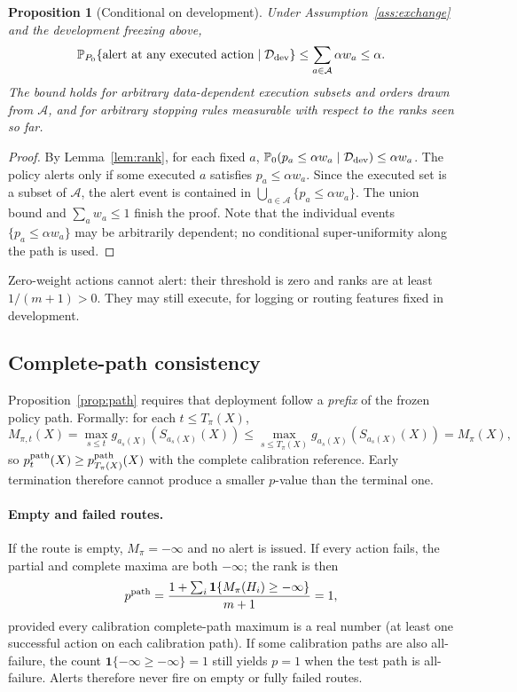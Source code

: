 \documentclass[pdflatex,sn-mathphys-num]{sn-jnl}
\newtheorem{proposition}{Proposition}
\newcommand{\Prob}{\mathbb{P}}
\newcommand{\ind}{\mathbf{1}}
\newcommand{\calD}{\mathcal{D}}
\newcommand{\calA}{\mathcal{A}}
\begin{document}
\begin{appendices}
\begin{proposition}[Conditional on development]\label{prop:spending-full}
Under Assumption~\ref{ass:exchange} and the development freezing above,
\[
 \Prob_{P_0}\{\text{alert at any executed action}\mid \calD_{\rm dev}\}
 \leq \sum_{a\in\calA}\alpha w_a \leq \alpha.
\]
The bound holds for arbitrary data-dependent execution subsets and orders drawn from \(\calA\), and for arbitrary stopping rules measurable with respect to the ranks seen so far.
\end{proposition}
\begin{proof}
By Lemma~\ref{lem:rank}, for each fixed \(a\), \(\Prob_0(p_a\leq\alpha w_a\mid\calD_{\rm dev})\leq\alpha w_a\). The policy alerts only if some executed \(a\) satisfies \(p_a\leq\alpha w_a\). Since the executed set is a subset of \(\calA\), the alert event is contained in \(\bigcup_{a\in\calA}\{p_a\leq\alpha w_a\}\). The union bound and \(\sum_a w_a\leq1\) finish the proof. Note that the individual events \(\{p_a\leq\alpha w_a\}\) may be arbitrarily dependent; no conditional super-uniformity along the path is used.
\end{proof}

Zero-weight actions cannot alert: their threshold is zero and ranks are at least \(1/(m+1)>0\). They may still execute, for logging or routing features fixed in development.

\subsection{Complete-path consistency}\label{app:complete-path}

Proposition~\ref{prop:path} requires that deployment follow a \emph{prefix} of the frozen policy path. Formally: for each \(t\leq T_\pi(X)\),
\[
 M_{\pi,t}(X)=\max_{s\leq t} g_{a_s(X)}(S_{a_s(X)}(X))
 \leq \max_{s\leq T_\pi(X)} g_{a_s(X)}(S_{a_s(X)}(X))=M_\pi(X),
\]
so \(p^{\rm path}_t(X)\geq p^{\rm path}_{T_\pi(X)}(X)\) with the complete calibration reference. Early termination therefore cannot produce a smaller \(p\)-value than the terminal one.

\paragraph*{Empty and failed routes.}
If the route is empty, \(M_\pi=-\infty\) and no alert is issued. If every action fails, the partial and complete maxima are both \(-\infty\); the rank is then
\[
 p^{\rm path}=\frac{1+\sum_i\ind\{M_\pi(H_i)\geq -\infty\}}{m+1}=1,
\]
provided every calibration complete-path maximum is a real number (at least one successful action on each calibration path). If some calibration paths are also all-failure, the count \(\ind\{-\infty\geq-\infty\}=1\) still yields \(p=1\) when the test path is all-failure. Alerts therefore never fire on empty or fully failed routes.


\end{appendices}
\end{document}
